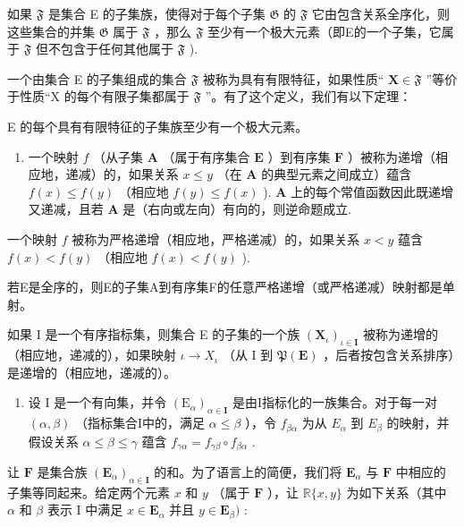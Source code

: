 如果 \(\mathfrak{F}\) 是集合 E 的子集族，使得对于每个子集 \(\mathfrak{G}\) 的 \(\mathfrak{F}\) 它由包含关系全序化，则这些集合的并集 \(\mathfrak{G}\) 属于 \(\mathfrak{F}\) ，那么 \(\mathfrak{F}\) 至少有一个极大元素（即E的一个子集，它属于 \(\mathfrak{F}\) 但不包含于任何其他属于 \(\mathfrak{F}\) ).

一个由集合 E 的子集组成的集合 \(\mathfrak{F}\) 被称为具有有限特征，如果性质“ \(\mathbf{X} \in \mathfrak{F}\) ”等价于性质“X 的每个有限子集都属于 \(\mathfrak{F}\) ”。有了这个定义，我们有以下定理：

E 的每个具有有限特征的子集族至少有一个极大元素。

\begin{enumerate}
\def\labelenumi{\arabic{enumi}.}
\setcounter{enumi}{11}
\tightlist
\item
  一个映射 \(f\) （从子集 \(\mathbf{A}\) （属于有序集合 \(\mathbf{E}\) ）到有序集 \(\mathbf{F}\) ）被称为递增（相应地，递减）的，如果关系 \(x \leqslant y\) （在 \(\mathbf{A}\) 的典型元素之间成立）蕴含 \(f(x) \leqslant f(y)\) （相应地 \(f(y) \leqslant f(x)\) ). \(\mathbf{A}\) 上的每个常值函数因此既递增又递减，且若 \(\mathbf{A}\) 是（右向或左向）有向的，则逆命题成立.
\end{enumerate}

一个映射 \(f\) 被称为严格递增（相应地，严格递减）的，如果关系 \(x < y\) 蕴含 \(f(x) < f(y)\) （相应地 \(f(x) < f(y)\) ).

若E是全序的，则E的子集A到有序集F的任意严格递增（或严格递减）映射都是单射。

如果 I 是一个有序指标集，则集合 E 的子集的一个族 \((\mathbf{X}_{\iota})_{\iota\in\mathbf{I}}\) 被称为递增的（相应地，递减的），如果映射 \(\iota\to X_{\iota}\) （从 I 到 \(\mathfrak{P}(\mathbf{E})\) ，后者按包含关系排序）是递增的（相应地，递减的）。

\begin{enumerate}
\def\labelenumi{\arabic{enumi}.}
\setcounter{enumi}{12}
\tightlist
\item
  设 I 是一个有向集，并令 \((\mathrm{E}_{\alpha})_{\alpha\in\mathbf{I}}\) 是由I指标化的一族集合。对于每一对 \((\alpha,\beta)\) （指标集合I中的，满足 \(\alpha\leqslant\beta\) ），令 \(f_{\beta\alpha}\) 为从 \(E_{\alpha}\) 到 \(E_{\beta}\) 的映射，并假设关系 \(\alpha\leqslant\beta\leqslant\gamma\) 蕴含 \(f_{\gamma\alpha}=f_{\gamma\beta}\circ f_{\beta\alpha}\) .
\end{enumerate}

让 \(\mathbf{F}\) 是集合族 \((\mathbf{E}_{\alpha})_{\alpha \in \mathbf{I}}\) 的和。为了语言上的简便，我们将 \(\mathbf{E}_{\alpha}\) 与 \(\mathbf{F}\) 中相应的子集等同起来。给定两个元素 \(x\) 和 \(y\) （属于 \(\mathbf{F}\) ），让 \(\mathbb{R}\{x, y\}\) 为如下关系（其中 \(\alpha\) 和 \(\beta\) 表示 I 中满足 \(x \in \mathbf{E}_{\alpha}\) 并且 \(y \in \mathbf{E}_{\beta})\) :

